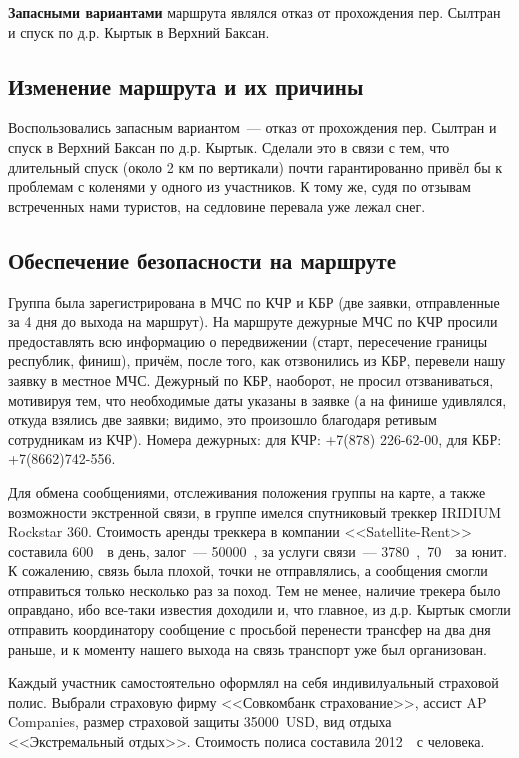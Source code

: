 \textbf{Запасными вариантами} маршрута являлся отказ от прохождения пер. Сылтран и спуск по д.р. Кыртык в Верхний Баксан.


\subsection{Изменение маршрута и их причины}
Воспользовались запасным вариантом~--- отказ от прохождения пер. Сылтран и спуск в Верхний Баксан по д.р. Кыртык. Сделали это в связи с тем, что длительный спуск (около 2 км по вертикали) почти гарантированно привёл бы к проблемам с коленями у одного из участников. К тому же, судя по отзывам встреченных нами туристов, на седловине перевала уже лежал снег.

\subsection{Обеспечение безопасности на маршруте}
Группа была зарегистрирована в МЧС по КЧР и КБР (две заявки, отправленные за 4 дня до выхода на маршрут). На маршруте дежурные МЧС по КЧР просили предоставлять всю информацию о передвижении (старт, пересечение границы республик, финиш), причём, после того, как отзвонились из КБР, перевели нашу заявку в местное МЧС. Дежурный по КБР, наоборот, не просил отзваниваться, мотивируя тем, что необходимые даты указаны в заявке (а на финише удивлялся, откуда взялись две заявки; видимо, это произошло благодаря ретивым сотрудникам из КЧР). Номера дежурных: для КЧР: +7(878) 226-62-00, для КБР: +7(8662)742-556.

Для обмена сообщениями, отслеживания положения группы на карте, а также возможности экстренной связи, в группе имелся спутниковый треккер IRIDIUM Rockstar 360. Стоимость аренды треккера в компании <<Satellite-Rent>> составила 600~\faRub~в день, залог~--- 50000~\faRub, за услуги связи~--- 3780~\faRuble,~70~\faRub~за юнит. К сожалению, связь была плохой, точки не отправлялись, а сообщения смогли отправиться только несколько раз за поход. Тем не менее, наличие трекера было оправдано, ибо все-таки известия доходили и, что главное, из д.р. Кыртык смогли отправить координатору сообщение с просьбой перенести трансфер на два дня раньше, и к моменту нашего выхода на связь транспорт уже был организован.

Каждый участник самостоятельно оформлял на себя индивилуальный страховой полис. Выбрали страховую фирму <<Совкомбанк страхование>>, ассист AP Companies, размер страховой защиты 35000~USD,  вид отдыха <<Экстремальный отдых>>. Стоимость полиса составила 2012~\faRuble~с человека.

